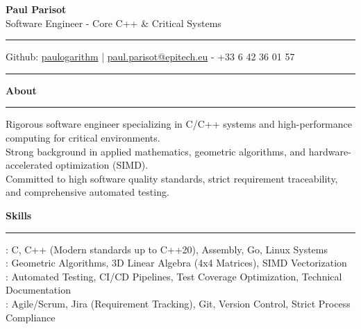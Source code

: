 \documentclass[9pt]{extarticle}
\begin{document}
\begin{center}
    {\huge\bfseries Paul Parisot}
    \\[10pt]
    {\Large Software Engineer - Core C++ \& Critical Systems}
    \\
\end{center}

\par\vspace{-10pt}
\rule{\linewidth}{0.4pt}
\par\vspace{-10pt}

\begin{center}
    Github: \href{https://github.com/paulogarithm}{paulogarithm} 
    \quad | \quad 
    \href{mailto:paul.parisot@epitech.eu}{paul.parisot@epitech.eu} - +33 6 42 36 01 57
\end{center}

\par\vspace{-15pt}
\rule{\linewidth}{0.4pt}
\par\vspace{5pt}

{\large\bfseries About}
\par\vspace{-8pt}
\rule{\linewidth}{0.4pt}
\par\vspace{5pt}

Rigorous software engineer specializing in C/C++ systems and high-performance computing for critical environments. \\
Strong background in applied mathematics, geometric algorithms, and hardware-accelerated optimization (SIMD). \\
Committed to high software quality standards, strict requirement traceability, and comprehensive automated testing.

\par\vspace{5pt}

{\large\bfseries Skills}
\par\vspace{-8pt}
\rule{\linewidth}{0.4pt}
\par\vspace{5pt}

\hspace*{5pt}{\bfseries Technical Expertise}: C, C++ (Modern standards up to C++20), Assembly, Go, Linux Systems \\
\hspace*{5pt}{\bfseries Math \& Computing}: Geometric Algorithms, 3D Linear Algebra (4x4 Matrices), SIMD Vectorization \\
\hspace*{5pt}{\bfseries Quality \& Testing}: Automated Testing, CI/CD Pipelines, Test Coverage Optimization, Technical Documentation \\
\hspace*{5pt}{\bfseries Workflow \& Tools}: Agile/Scrum, Jira (Requirement Tracking), Git, Version Control, Strict Process Compliance
\end{document}
